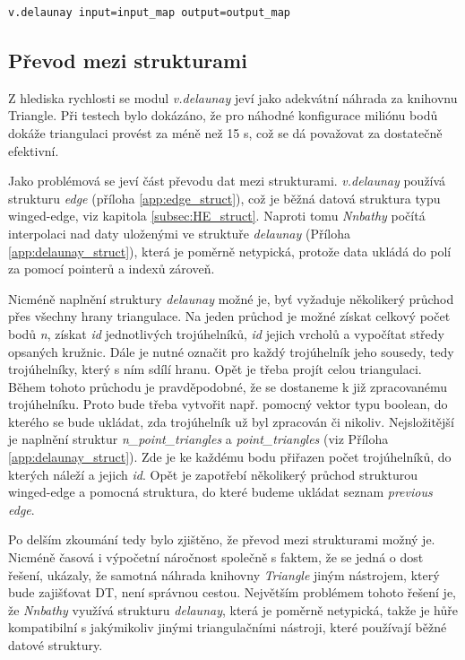 \documentclass[12pt,a4paper]{article}
\begin{document}
\begin{lstlisting}[caption={Volání modulu v.delaunay z příkazové řádky}]
v.delaunay input=input_map output=output_map
\end{lstlisting}

\bigskip
\subsection{Převod mezi strukturami}

Z hlediska rychlosti se modul \emph{v.delaunay} jeví jako adekvátní
náhrada za knihovnu Triangle. Při testech bylo dokázáno, že pro
náhodné konfigurace miliónu bodů dokáže triangulaci provést za méně
než 15 s, což se dá považovat za dostatečně efektivní. 

Jako problémová se jeví část převodu dat mezi
strukturami. \emph{v.delaunay} používá strukturu \emph{edge} (příloha \ref{app:edge_struct}),
což je běžná datová struktura typu winged-edge, viz kapitola \ref{subsec:HE_struct}. Naproti tomu \emph{Nnbathy} počítá interpolaci nad daty uloženými ve
struktuře \emph{delaunay} (Příloha \ref{app:delaunay_struct}), která
je poměrně netypická, protože data ukládá do polí za pomocí pointerů a
indexů zároveň.

Nicméně naplnění struktury \emph{delaunay} možné je, byť vyžaduje
několikerý průchod přes všechny hrany triangulace. Na jeden průchod je
možné získat celkový počet bodů \emph{n}, získat \emph{id}
jednotlivých trojúhelníků, \emph{id} jejich vrcholů a vypočítat středy
opsaných kružnic. Dále je nutné označit pro každý trojúhelník jeho
sousedy, tedy trojúhelníky, který s ním sdílí hranu. Opět je třeba
projít celou triangulaci. Během tohoto průchodu je pravděpodobné, že
se dostaneme k již zpracovanému trojúhelníku. Proto bude třeba
vytvořit např. pomocný vektor typu boolean, do kterého se bude
ukládat, zda trojúhelník už byl zpracován či nikoliv. Nejsložitější je
naplnění struktur \emph{n\_point\_triangles} a \emph{point\_triangles}
(viz Příloha \ref{app:delaunay_struct}). Zde je ke každému bodu
přiřazen počet trojúhelníků, do kterých náleží a jejich
\emph{id}. Opět je zapotřebí několikerý průchod strukturou winged-edge
a pomocná struktura, do které budeme ukládat seznam \emph{previous
  edge}.

Po delším zkoumání tedy bylo zjištěno, že převod mezi strukturami
možný je. Nicméně časová i výpočetní náročnost společně s faktem, že
se jedná o dost  řešení, ukázaly, že samotná náhrada
knihovny \emph{Triangle} jiným nástrojem, který bude zajišťovat DT,
není správnou cestou. Největším problémem tohoto řešení je, že
\emph{Nnbathy} využívá strukturu \emph{delaunay}, která je poměrně
netypická, takže je hůře kompatibilní s jakýmikoliv jinými
triangulačními nástroji, které používají běžné datové struktury.
\end{document}
